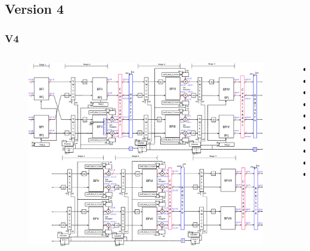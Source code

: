 \documentclass[t]{beamer}
\begin{document}
\subsection{Version 4}

\begin{frame}
\frametitle{V4}	
\begin{columns}[T] %
\begin{column}{.7\textwidth}
\vspace*{-0.8cm}
 \begin{figure}[ht]
    \centering
  \includegraphics[height=0.7\paperheight]{image/V4_esquema_p.eps} \\
    \end{figure}

\end{column}%

\begin{column}{.3\textwidth}


\begin{itemize}
\item
\item
\item
\item
\item
\item
\item
\item
\item
\item
\end{itemize}

\end{column}
\end{columns}

\end{frame}
\end{document}

